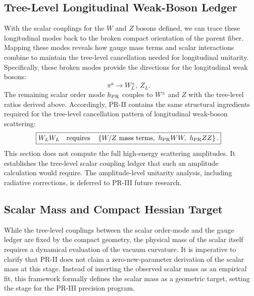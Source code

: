 \documentclass[11pt]{article}
\begin{document}
\subsection{Tree-Level Longitudinal Weak-Boson Ledger}
\label{sec:pr2_longitudinal_weak_boson_ledger}

With the scalar couplings for the $W$ and $Z$ bosons defined, we can trace these longitudinal modes back to the broken compact orientation of the parent fiber. Mapping these modes reveals how gauge mass terms and scalar interactions combine to maintain the tree-level cancellation needed for longitudinal unitarity. Specifically, these broken modes provide the directions for the longitudinal weak bosons:
\begin{equation}
\boxed{
\pi^a
\rightarrow
W_L^\pm,\ Z_L.
}
\end{equation}
The remaining scalar order mode \(h_{\rm PR}\) couples to \(W^\pm\) and \(Z\) with the tree-level ratios derived above. 
Accordingly, PR-II contains the same structural ingredients required for the tree-level cancellation pattern \cite{LeeQuiggThacker1977} of longitudinal weak-boson scattering:
\begin{equation}
\boxed{
W_LW_L
\quad
\text{requires}
\quad
\left\{
W/Z\ \text{mass terms},
\ h_{\rm PR}WW,
\ h_{\rm PR}ZZ
\right\}.
}
\end{equation}
This section does not compute the full high-energy scattering amplitudes. 
It establishes the tree-level scalar coupling ledger that such an amplitude calculation would require. The amplitude-level unitarity analysis, including radiative corrections, is deferred to PR-III future research.

\subsection{Scalar Mass and Compact Hessian Target}
\label{sec:pr2_scalar_mass_hessian}

While the tree-level couplings between the scalar order-mode and the gauge ledger are fixed by the compact geometry, the physical mass of the scalar itself requires a dynamical evaluation of the vacuum curvature. It is imperative to clarify that PR-II does not claim a zero-new-parameter derivation of the scalar mass at this stage. Instead of inserting the observed scalar mass as an empirical fit, this framework formally defines the scalar mass as a geometric target, setting the stage for the PR-III precision program.
\end{document}
